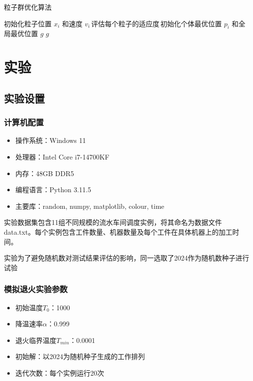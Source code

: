 \documentclass[12pt]{article}
\begin{document}
	\begin{algorithm}[H]
		\caption{粒子群优化算法}
		初始化粒子位置 $x_i$ 和速度 $v_i$\,评估每个粒子的适应度\,初始化个体最优位置 $p_i$ 和全局最优位置 $g$\;
		\Return $g$
	\end{algorithm}
	
	
	\section{实验}
	\subsection{实验设置}
	\subsubsection{计算机配置}
	
	\begin{itemize}
		\item 操作系统：Windows 11
		\item 处理器：Intel Core i7-14700KF
		\item 内存：48GB DDR5
		\item 编程语言：Python 3.11.5
		\item 主要库：random, numpy, matplotlib, colour, time
	\end{itemize}
	
	实验数据集包含11组不同规模的流⽔车间调度实例，将其命名为数据文件data.txt。每个实例包含工件数量、机器数量及每个工件在具体机器上的加工时间。

	实验为了避免随机数对测试结果评估的影响，同一选取了2024作为随机数种子进行试验
	
	\subsubsection{模拟退火实验参数}
	\begin{itemize}
		\item 初始温度$T_0$：1000
		\item 降温速率$\alpha$：0.999
		\item 退火临界温度$T_{min}$：0.0001
		\item 初始解：以2024为随机种子生成的工作排列
		\item 迭代次数：每个实例运行20次
	\end{itemize}
	
\end{document}
